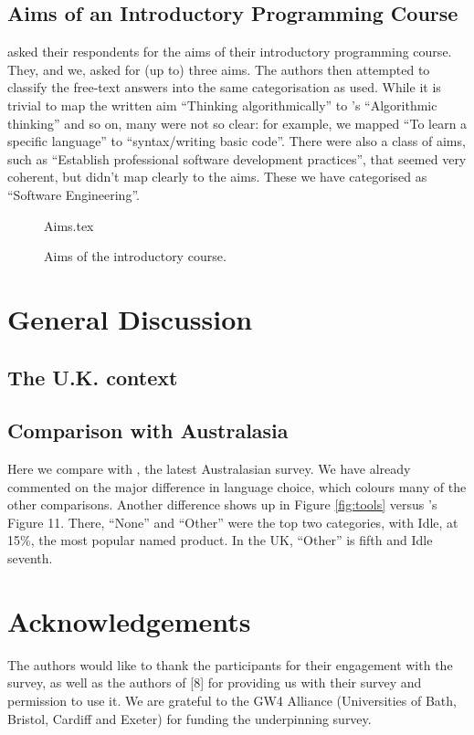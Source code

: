 \documentclass{sig-alternate}
\begin{document}
\subsection{Aims of an Introductory Programming Course}
 \cite{mason+cooper:2014} asked their respondents for the aims of their introductory programming course. They, and we, asked for (up to) three aims. The authors then attempted to classify the free-text answers into the same categorisation as  \cite{mason+cooper:2014} used. While it is trivial to map the written aim ``Thinking algorithmically'' to \cite{mason+cooper:2014}'s ``Algorithmic thinking'' and so on, many were not so clear: for example, we mapped ``To learn a specific language'' to ``syntax/writing basic code''. There were also a class of aims, such as ``Establish professional software development practices'', that seemed very coherent, but didn't map clearly to the \cite{mason+cooper:2014} aims. These we have categorised as ``Software Engineering''.

\begin{figure}
\begin{center}
{Aims.tex}
\end{center}\vskip-18pt
\caption{Aims of the introductory course. \label{fig:aims}}
\end{figure}

\section{General Discussion}\label{discussion}

\subsection{The U.K. context}

\subsection{Comparison with Australasia}
Here we compare with \cite{mason+cooper:2014}, the latest Australasian survey. We have already commented on the major difference in language choice,  which colours many of the other comparisons. Another difference shows up in Figure \ref{fig:tools} versus \cite{mason+cooper:2014}'s Figure 11. There, ``None'' and ``Other'' were the top two categories, with Idle, at 15\%, the most popular named product. In the UK, ``Other'' is fifth and Idle seventh.


\section{Acknowledgements}

The authors would like to thank the participants for their engagement
with the survey, as well as the authors of [8] for providing us with their survey and permission to use it.
We are grateful to the GW4 Alliance (Universities of Bath, Bristol, Cardiff and Exeter) for funding the underpinning survey.


\end{document}
